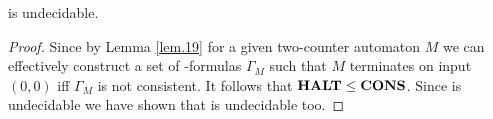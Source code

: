 \begin{theorem}
	\PCons{} is undecidable.
\end{theorem}
\begin{proof}
	Since by Lemma \ref{lem.19} for a given two-counter automaton $M$ we can effectively construct a set of \SysP-formulas $\Gamma_M$ such that $M$ terminates on input $(0,0)$ iff $\Gamma_M$ is not consistent. It follows that $\textbf{HALT}\leq\textbf{CONS}$. Since \autHalt{} is undecidable we have shown that \PCons{} is undecidable too.
\end{proof}
